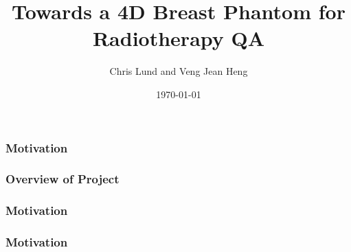 \documentclass{beamer}
\title[4D Breast Phantom]{Towards a 4D Breast Phantom for Radiotherapy QA}
\author[C. Lund, V.J. Heng]{Chris Lund and Veng Jean Heng}
\institute[McGill MPU]{Medical Physics Unit \\ Department of Oncology, McGill University}
\date{\today}
\begin{document}
\begin{frame}

    \maketitle

\end{frame}

\begin{frame}

    \frametitle{Motivation}

\end{frame}

\begin{frame}

    \frametitle{Overview of Project}

\end{frame}

\begin{frame}

    \frametitle{Motivation}

\end{frame}

\begin{frame}

    \frametitle{Motivation}

\end{frame}
\end{document}
